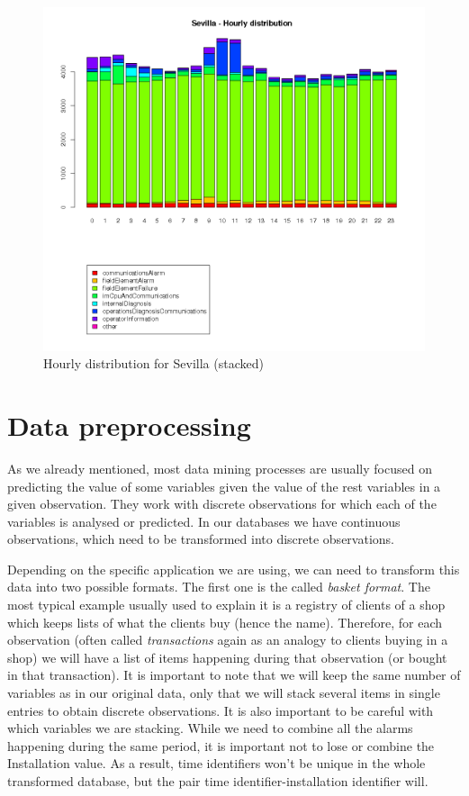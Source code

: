 \documentclass[a4paper,12pt]{article}
\begin{document}
\begin{figure}[htb]
 \centering
 \includegraphics[width=\textwidth]{./img/sevilla_timeline.png}
 \caption{Hourly distribution for Sevilla (stacked)} \label{fig:sevilla_timeline}
\end{figure}

\clearpage

\section{Data preprocessing}\label{sec:data_preprocessing}
As we already mentioned, most data mining processes are usually focused on predicting the value of some variables given the value of the rest variables in a given observation. They work with discrete observations for which each of the variables is analysed or predicted. In our databases we have continuous observations, which need to be transformed into discrete observations\cite{zaki2001spade}.

Depending on the specific application we are using, we can need to transform this data into two possible formats. The first one is the called \emph{basket format}. The most typical example usually used to explain it is a registry of clients of a shop which keeps lists of what the clients buy (hence the name). Therefore, for each observation (often called \emph{transactions} again as an analogy to clients buying in a shop) we will have a list of items happening during that observation (or bought in that transaction). It is important to note that we will keep the same number of variables as in our original data, only that we will stack several items in single entries to obtain discrete observations. It is also important to be careful with which variables we are stacking. While we need to combine all the alarms happening during the same period, it is important not to lose or combine the Installation value. As a result, time identifiers won't be unique in the whole transformed database, but the pair time identifier-installation identifier will.
\end{document}
